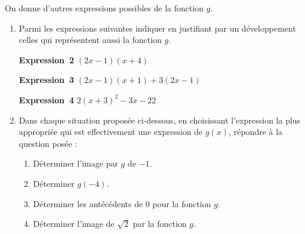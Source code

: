 On donne d’autres expressions possibles de la fonction $g$.
\begin{enumerate}
	\item Parmi les expressions suivantes indiquer en justifiant par un développement celles qui représentent aussi la fonction $g$.


	\textbf{Expression~2} $(2x - 1)(x + 4)$


	\textbf{Expression~3} $(2x - 1)(x + 1) + 3(2x - 1)$


	\textbf{Expression~4} $2(x + 3)^2 - 3x - 22$
	
	
	\item Dans chaque situation proposée ci-dessous, en choisissant l’expression la plus appropriée qui est effectivement une expression de $g(x)$, répondre à la question posée :
	\begin{enumerate}
		\item Déterminer l’image par $g$ de $-1$.
		\item Déterminer $g(-4)$.
		\item Déterminer les antécédents de $0$ pour la fonction $g$.
		\item Déterminer l’image de $\sqrt{2}$ par la fonction $g$.
	\end{enumerate}
\end{enumerate}

